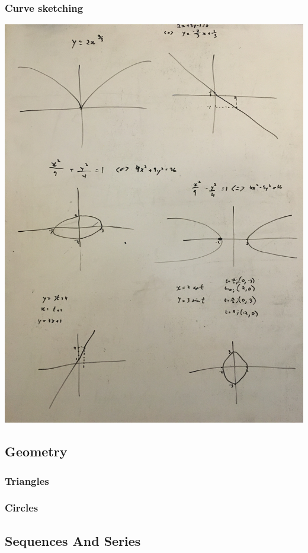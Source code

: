 \documentclass{article}
\begin{document}
\subsubsection{Curve sketching}
\includegraphics[scale = 0.1, angle =-90]{media/Assorted_graphs}


\subsection{Geometry}
\subsubsection{Triangles}


\subsubsection{Circles}


\subsection{Sequences And Series}
\end{document}
